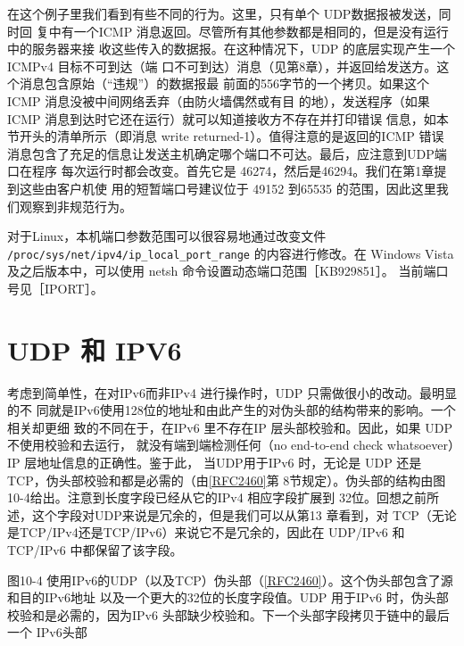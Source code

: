 在这个例子里我们看到有些不同的行为。这里，只有单个 UDP数据报被发送，同时回
复中有一个ICMP 消息返回。尽管所有其他参数都是相同的，但是没有运行中的服务器来接
收这些传入的数据报。在这种情况下，UDP 的底层实现产生一个 ICMPv4 目标不可到达（端
口不可到达）消息（见第8章），并返回给发送方。这个消息包含原始（“违规”）的数据报最
前面的556字节的一个拷贝。如果这个ICMP 消息没被中间网络丢弃（由防火墙偶然或有目
的地），发送程序（如果ICMP 消息到达时它还在运行）就可以知道接收方不存在并打印错误
信息，如本节开头的清单所示（即消息 write returned-1）。值得注意的是返回的ICMP 错误
消息包含了充足的信息让发送主机确定哪个端口不可达。最后，应注意到UDP端口在程序
每次运行时都会改变。首先它是 46274，然后是46294。我们在第1章提到这些由客户机使
用的短暂端口号建议位于 49152 到65535 的范围，因此这里我们观察到非规范行为。

\begin{tcolorbox}
  对于Linux，本机端口参数范围可以很容易地通过改变文件 \verb|/proc/sys/net/ipv4/ip_local_port_range|
  的内容进行修改。在 Windows Vista及之后版本中，可以使用 netsh 命令设置动态端口范围［KB929851］。
  当前端口号见［IPORT］。
\end{tcolorbox}

\section{UDP 和 IPV6}
考虑到简单性，在对IPv6而非IPv4 进行操作时，UDP 只需做很小的改动。最明显的不
同就是IPv6使用128位的地址和由此产生的对伪头部的结构带来的影响。一个相关却更细
致的不同在于，在IPv6 里不存在IP 层头部校验和。因此，如果 UDP 不使用校验和去运行，
就没有端到端检测任何（no end-to-end check whatsoever）IP 层地址信息的正确性。鉴于此，
当UDP用于IPv6 时，无论是 UDP
还是TCP，伪头部校验和都是必需的（由\href{https://www.rfc-editor.org/rfc/rfc2460}{[RFC2460]}第
8节规定）。伪头部的结构由图10-4给出。注意到长度字段已经从它的IPv4 相应字段扩展到
32位。回想之前所述，这个字段对UDP来说是冗余的，但是我们可以从第13 章看到，对
TCP（无论是TCP/IPv4还是TCP/IPv6）来说它不是冗余的，因此在 UDP/IPv6 和 TCP/IPv6
中都保留了该字段。

图10-4
使用IPv6的UDP（以及TCP）伪头部（\href{https://www.rfc-editor.org/rfc/rfc2460}{[RFC2460]}）。这个伪头部包含了源和目的IPv6地址
以及一个更大的32位的长度字段值。UDP 用于IPv6 时，伪头部校验和是必需的，因为IPv6
头部缺少校验和。下一个头部字段拷贝于链中的最后一个 IPv6头部

